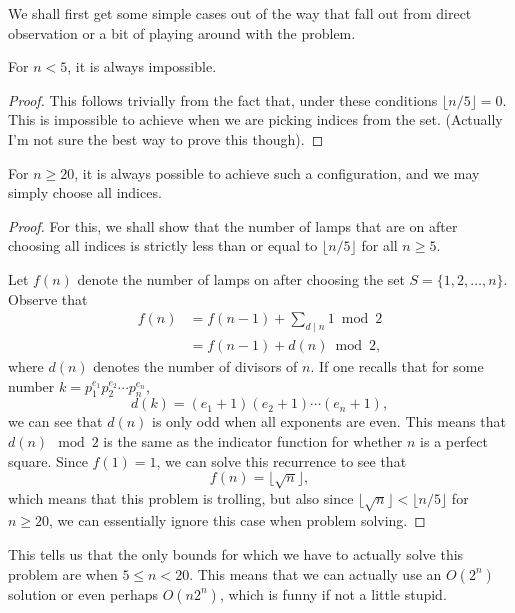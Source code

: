 \documentclass[a4paper, 12pt]{article}
\begin{document}
\begin{solution}
    We shall first get some simple cases out of the way that fall out from direct observation or a bit of playing around with the problem.
    \begin{claim}
        For \( n < 5 \), it is always impossible.
    \end{claim}
    \begin{proof}
        This follows trivially from the fact that, under these conditions \( \lfloor n / 5 \rfloor = 0 \). This is impossible to achieve when we are picking indices from the set. (Actually I'm not sure the best way to prove this though).
    \end{proof}

    \begin{claim}
        For \( n \ge 20 \), it is always possible to achieve such a configuration, and we may simply choose all indices.
    \end{claim}

    \begin{proof}
        For this, we shall show that the number of lamps that are on after choosing all indices is strictly less than or equal to \( \lfloor n / 5 \rfloor \) for all \( n \ge 5 \).

        Let \( f(n) \) denote the number of lamps on after choosing the set \( S = \{ 1, 2, \ldots, n \} \). Observe that
        \begin{align*}
            f(n) &= f(n-1) + \sum_{d \mid n} 1 \bmod 2 \\
            &= f(n-1) + d(n) \bmod 2
        ,\end{align*}
        where \( d(n) \) denotes the number of divisors of \( n \). If one recalls that for some number \( k = p_1^{e_1} p_2^{e_2} \cdots p_n^{e_n} \),
        \[
            d(k) = (e_1 + 1)(e_2 + 1) \cdots (e_n + 1)
        ,\]
        we can see that \( d(n) \) is only odd when all exponents are even. This means that \( d(n) \mod 2 \) is the same as the indicator function for whether \( n \) is a perfect square. Since \( f(1) = 1 \), we can solve this recurrence to see that
        \[
            f(n) = \lfloor \sqrt{n} \rfloor
        ,\]
        which means that this problem is trolling, but also since \( \lfloor \sqrt{n} \rfloor < \lfloor n / 5 \rfloor \) for \( n \ge 20 \), we can essentially ignore this case when problem solving.
    \end{proof}

    This tells us that the only bounds for which we have to actually solve this problem are when \( 5 \le n < 20 \). This means that we can actually use an \( O(2^n) \) solution or even perhaps \( O(n 2^n) \), which is funny if not a little stupid.


\end{solution}
\end{document}
